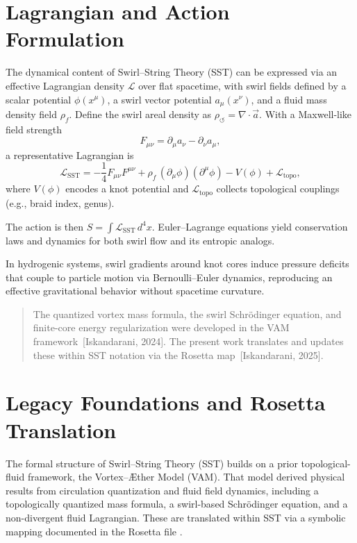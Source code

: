 \documentclass[reprint,aps,onecolumn,nofootinbib]{revtex4-2}
\newcommand{\rhof}{\rho_{\!f}}                           %
\begin{document}
\section{Lagrangian and Action Formulation}
    The dynamical content of Swirl–String Theory (SST) can be expressed via an effective Lagrangian density $\mathcal{L}$ over flat spacetime, with swirl fields defined by a scalar potential $\phi(x^\mu)$, a swirl vector potential $a_\mu(x^\nu)$, and a fluid mass density field $\rhof$. Define the swirl areal density as $\rho_{\circlearrowleft} = \nabla \cdot \vec{a}$. With a Maxwell-like field strength
    \[
        F_{\mu\nu} = \partial_\mu a_\nu - \partial_\nu a_\mu,
    \]
    a representative Lagrangian is
    \[
        \mathcal{L}_{\text{SST}} = -\frac{1}{4} F_{\mu\nu} F^{\mu\nu} + \rhof\, (\partial_\mu \phi)(\partial^\mu \phi) - V(\phi) + \mathcal{L}_\text{topo},
    \]
    where $V(\phi)$ encodes a knot potential and $\mathcal{L}_\text{topo}$ collects topological couplings (e.g., braid index, genus).

    The action is then $S = \int \mathcal{L}_{\text{SST}} \, d^4x$. Euler–Lagrange equations yield conservation laws and dynamics for both swirl flow and its entropic analogs.

    In hydrogenic systems, swirl gradients around knot cores induce pressure deficits that couple to particle motion via Bernoulli–Euler dynamics, reproducing an effective gravitational behavior without spacetime curvature.

    \begin{quote}
    The quantized vortex mass formula, the swirl Schrödinger equation, and finite-core energy regularization were developed in the VAM framework~[Iskandarani, 2024]. The present work translates and updates these within SST notation via the Rosetta map~[Iskandarani, 2025]. %
    \end{quote}



\section{Legacy Foundations and Rosetta Translation}
\label{sec:legacy-rosetta}

    The formal structure of Swirl–String Theory (SST) builds on a prior topological-fluid framework, the Vortex–Æther Model (VAM). That model derived physical results from circulation quantization and fluid field dynamics, including a topologically quantized mass formula, a swirl-based Schrödinger equation, and a non-divergent fluid Lagrangian. These are translated within SST via a symbolic mapping documented in the Rosetta file \cite{VAM-15, vamrosetta2025}.
\end{document}
